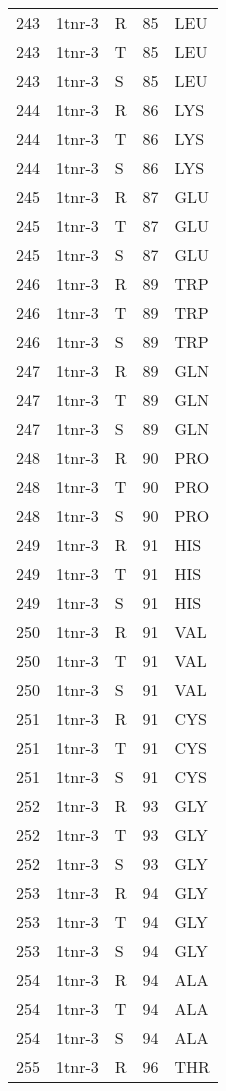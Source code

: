 \begin{longtable}[l]{l|l|l|l|l}
	243 & 1tnr-3 & R & 85 & LEU \\
	243 & 1tnr-3 & T & 85 & LEU \\
	243 & 1tnr-3 & S & 85 & LEU \\
	244 & 1tnr-3 & R & 86 & LYS \\
	244 & 1tnr-3 & T & 86 & LYS \\
	244 & 1tnr-3 & S & 86 & LYS \\
	245 & 1tnr-3 & R & 87 & GLU \\
	245 & 1tnr-3 & T & 87 & GLU \\
	245 & 1tnr-3 & S & 87 & GLU \\
	246 & 1tnr-3 & R & 89 & TRP \\
	246 & 1tnr-3 & T & 89 & TRP \\
	246 & 1tnr-3 & S & 89 & TRP \\
	247 & 1tnr-3 & R & 89 & GLN \\
	247 & 1tnr-3 & T & 89 & GLN \\
	247 & 1tnr-3 & S & 89 & GLN \\
	248 & 1tnr-3 & R & 90 & PRO \\
	248 & 1tnr-3 & T & 90 & PRO \\
	248 & 1tnr-3 & S & 90 & PRO \\
	249 & 1tnr-3 & R & 91 & HIS \\
	249 & 1tnr-3 & T & 91 & HIS \\
	249 & 1tnr-3 & S & 91 & HIS \\
	250 & 1tnr-3 & R & 91 & VAL \\
	250 & 1tnr-3 & T & 91 & VAL \\
	250 & 1tnr-3 & S & 91 & VAL \\
	251 & 1tnr-3 & R & 91 & CYS \\
	251 & 1tnr-3 & T & 91 & CYS \\
	251 & 1tnr-3 & S & 91 & CYS \\
	252 & 1tnr-3 & R & 93 & GLY \\
	252 & 1tnr-3 & T & 93 & GLY \\
	252 & 1tnr-3 & S & 93 & GLY \\
	253 & 1tnr-3 & R & 94 & GLY \\
	253 & 1tnr-3 & T & 94 & GLY \\
	253 & 1tnr-3 & S & 94 & GLY \\
	254 & 1tnr-3 & R & 94 & ALA \\
	254 & 1tnr-3 & T & 94 & ALA \\
	254 & 1tnr-3 & S & 94 & ALA \\
	255 & 1tnr-3 & R & 96 & THR \\

\end{longtable}
